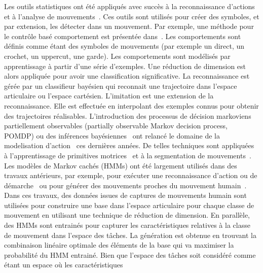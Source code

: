 Les outils statistiques ont \'et\'e appliqu\'es avec succ\`es \`a la 
reconnaissance d'actions et \`a l'analyse de mouvements~\cite{schaal03}.
Ces outils sont utilis\'es pour cr\'eer des symboles, et par extension,
les d\'etecter dans un mouvement.
Par exemple, une m\'ethode pour le contr\^ole bas\'e comportement est 
pr\'esentée dans~\cite{drumwright03, drumwright04}. 
Les comportements sont d\'efinis comme \'etant des symboles de mouvements
(par exemple un direct, un crochet, un uppercut, une garde).
Les comportements sont mod\'elis\'es par apprentissage \`a partir d'une 
s\'erie d'exemples.
Une r\'eduction de dimension est alors appliqu\'ee pour avoir une classification
significative. La reconnaissance est g\'er\'ee par
un classifieur bayésien qui reconnait une trajectoire
dans l'espace articulaire ou l'espace cart\'esien. 
L'imitation est une extension de la reconnaissance.
Elle est effectuée en interpolant des exemples connus pour obtenir
des trajectoires réalisables.
L'introduction des processus de décision markoviens partiellement observables 
(partially observable Markov decision process, POMDP) ou des inférences bayésiennes~\cite{pearl88} 
ont relancé le domaine de la modelisation d'action~\cite{kaelbling98} ces dernières années. 
De telles techniques sont appliquées à l'apprentissage de primitives motrices~\cite{peters08} 
et à la segmentation de mouvements~\cite{calinon10, inamura04}. 
Les modèles de Markov cachés (HMMs) ont été largement utilisés dans des travaux antérieurs,
par exemple, pour exécuter une reconnaissance d'action ou de démarche~\cite{gu10}
ou pour générer des mouvements proches du mouvement humain~\cite{kwon08}. 
Dans ces travaux, des données issues de captures de mouvements humain sont utilisées
pour construire une base dans l'espace articulaire pour chaque classe de mouvement
en utilisant une technique de réduction de dimension.
En parallèle, des HMMs sont entrainés pour capturer les caractéristiques relatives
à la classe de mouvement dans l'espace des t\^aches.
La génération est obtenue en trouvant la combinaison linéaire optimale des éléments 
de la base qui va maximiser la probabilité du HMM entrainé.
Bien que l'espace des t\^aches soit considéré comme étant un espace où les caractéristiques

